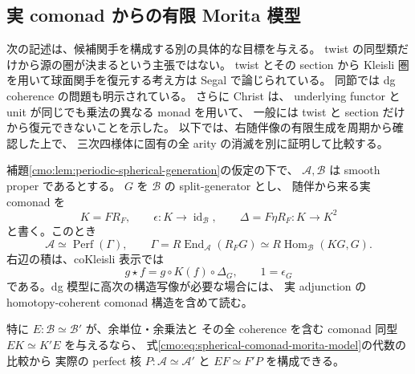 \subsection{実 comonad からの有限 Morita 模型}

次の記述は、候補関手を構成する別の具体的な目標を与える。
twist の同型類だけから源の圏が決まるという主張ではない。
twist とその section から Kleisli 圏を用いて球面関手を復元する考え方は
Segal \cite[Section~3.2]{CMOSegalSphericalTwists}で論じられている。
同節では dg coherence の問題も明示されている。
さらに Christ \cite[Section~4.1, Example~4.10]{CMOChristSphericalMonadic}は、
underlying functor と unit が同じでも乗法の異なる monad を用いて、
一般には twist と section だけから復元できないことを示した。
以下では、右随伴像の有限生成を周期から確認した上で、
三次四様体に固有の全 arity の消滅を別に証明して比較する。

\begin{proposition}
\label{cmo:prop:spherical-comonad-model}
補題\ref{cmo:lem:periodic-spherical-generation}の仮定の下で、
$\mathcal A,\mathcal B$ は smooth proper であるとする。
$G$ を $\mathcal B$ の split-generator とし、
随伴から来る実 comonad を
\[
 K=F R_F,\qquad
 \epsilon:K\longrightarrow\operatorname{id}_{\mathcal B},\qquad
 \Delta=F\eta R_F:K\longrightarrow K^2
\]
と書く。このとき
\begin{equation}
\label{cmo:eq:spherical-comonad-morita-model}
 \mathcal A\simeq\operatorname{Perf}(\Gamma),\qquad
 \Gamma=R\operatorname{End}_{\mathcal A}(R_FG)
       \simeq R\operatorname{Hom}_{\mathcal B}(KG,G).
\end{equation}
右辺の積は、coKleisli 表示では
\begin{equation}
\label{cmo:eq:spherical-comonad-product}
 g\star f=g\circ K(f)\circ\Delta_G,\qquad 1=\epsilon_G
\end{equation}
である。dg 模型に高次の構造写像が必要な場合には、
実 adjunction の homotopy-coherent comonad 構造を含めて読む。

特に $E:\mathcal B\simeq\mathcal B'$ が、余単位・余乗法と
その全 coherence を含む comonad 同型 $EK\simeq K'E$ を与えるなら、
式\eqref{cmo:eq:spherical-comonad-morita-model}の代数の比較から
実際の perfect 核 $P:\mathcal A\simeq\mathcal A'$ と
$EF\simeq F'P$ を構成できる。
\end{proposition}

